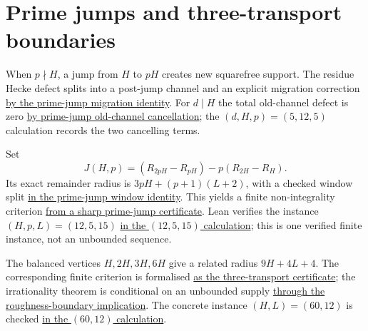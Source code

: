 \documentclass[11pt]{article}
\newcommand{\commit}{c24e2c2a781aa4a104d10884bacae52ef35cff30}
\newcommand{\repobase}{https://github.com/wcook04/plectis-lean-erdos249-257/blob/\commit}
\newcommand{\PK}{Erdos249257}
\newcommand{\lword}[4]{\href{\repobase/\PK/#1\#L#2}{#4}}
\theoremstyle{remark}\newtheorem*{remark}{Remark}
\begin{document}
\section{Prime jumps and three-transport boundaries}\label{sec:primejump}
When $p\nmid H$, a jump from $H$ to $pH$ creates new squarefree support.  The
residue Hecke defect splits into a post-jump channel and an explicit migration
correction
\lword{PrimeJumpMigration.lean}{38}{residueHeckeDefect_eq_postJump_add_migration}{by the prime-jump migration identity}.
For $d\mid H$ the total old-channel defect is zero
\lword{PrimeJumpMigration.lean}{46}{residueHeckeDefect_eq_zero_of_dvd}{by prime-jump old-channel cancellation}; the
$(d,H,p)=(5,12,5)$ calculation records the two cancelling terms.

Set
\[
 J(H,p)=(R_{2pH}-R_{pH})-p(R_{2H}-R_H).
\]
Its exact remainder radius is $3pH+(p+1)(L+2)$, with a checked window split
\lword{PrimeJumpWindow.lean}{91}{primeJumpTailCommutator_eq_window_add_remainder}{in the prime-jump window identity}.
This yields a finite non-integrality criterion
\lword{PrimeJumpWindow.lean}{178}{primeJumpTailCommutator_notMem_int_of_sharpKill}{from a sharp prime-jump certificate}.
Lean verifies the instance $(H,p,L)=(12,5,15)$
\lword{PrimeJumpWindow.lean}{186}{primeJumpSharpKill_twelve_five}{in the \((12,5,15)\) calculation}; this is one
verified finite instance, not an unbounded sequence.

The balanced vertices $H,2H,3H,6H$ give a related radius $9H+4L+4$.
The corresponding finite criterion is formalised
\lword{ThreeTransportBoundary.lean}{126}{threeTransport_notMem_int_of_cert}{as the three-transport certificate};
the irrationality theorem is conditional on an unbounded supply
\lword{ThreeTransportBoundary.lean}{177}{irrational_totientSeries_of_roughnessBoundaryLatticeSupply}{through the roughness-boundary implication}.
The concrete instance $(H,L)=(60,12)$ is checked
\lword{ThreeTransportBoundary.lean}{203}{sharpThreeTransportCert_60_12}{in the \((60,12)\) calculation}.
\end{document}
